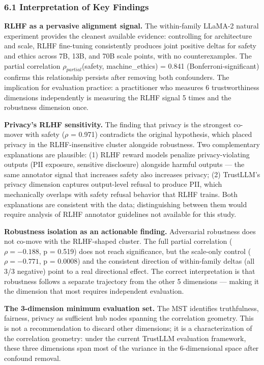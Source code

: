 
\subsubsection{6.1 Interpretation of Key Findings}

\textbf{RLHF as a pervasive alignment signal.} The within-family LLaMA-2 natural experiment provides the cleanest available evidence: controlling for architecture and scale, RLHF fine-tuning consistently produces joint positive deltas for safety and ethics across 7B, 13B, and 70B scale points, with no counterexamples. The partial correlation $\rho_{partial}$(safety, machine\_ethics) = 0.841 (Bonferroni-significant) confirms this relationship persists after removing both confounders. The implication for evaluation practice: a practitioner who measures 6 trustworthiness dimensions independently is measuring the RLHF signal 5 times and the robustness dimension once.

\textbf{Privacy's RLHF sensitivity.} The finding that privacy is the strongest co-mover with safety ($\rho$ = 0.971) contradicts the original hypothesis, which placed privacy in the RLHF-insensitive cluster alongside robustness. Two complementary explanations are plausible: (1) RLHF reward models penalize privacy-violating outputs (PII exposure, sensitive disclosure) alongside harmful outputs --- the same annotator signal that increases safety also increases privacy; (2) TrustLLM's privacy dimension captures output-level refusal to produce PII, which mechanically overlaps with safety refusal behavior that RLHF trains. Both explanations are consistent with the data; distinguishing between them would require analysis of RLHF annotator guidelines not available for this study.

\textbf{Robustness isolation as an actionable finding.} Adversarial robustness does not co-move with the RLHF-shaped cluster. The full partial correlation ($\rho = -0.188$, p = 0.519) does not reach significance, but the scale-only control ($\rho = -0.771$, p = 0.0008) and the consistent direction of within-family deltas (all 3/3 negative) point to a real directional effect. The correct interpretation is that robustness follows a separate trajectory from the other 5 dimensions --- making it the dimension that most requires independent evaluation.

\textbf{The 3-dimension minimum evaluation set.} The MST identifies {truthfulness, fairness, privacy} as sufficient hub nodes spanning the correlation geometry. This is not a recommendation to discard other dimensions; it is a characterization of the correlation geometry: under the current TrustLLM evaluation framework, these three dimensions span most of the variance in the 6-dimensional space after confound removal.

